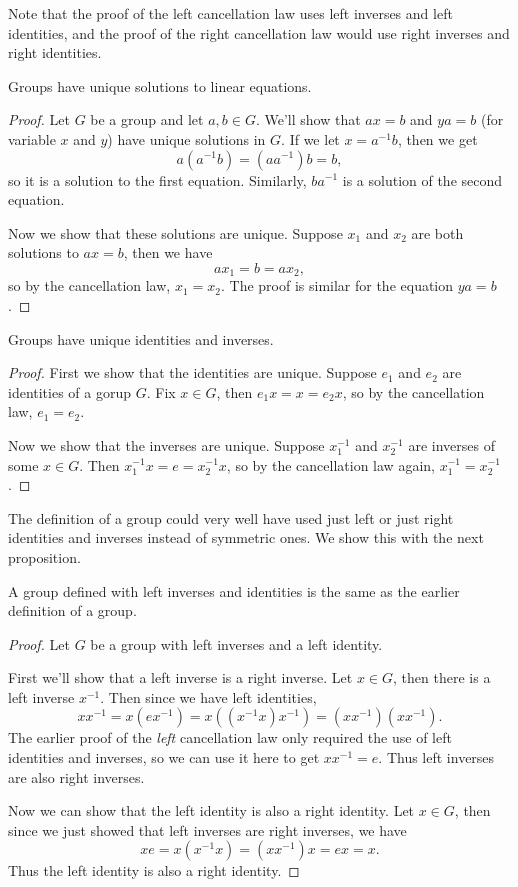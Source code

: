 \documentclass[10pt]{report}
\begin{document}
Note that the proof of the left cancellation law uses left inverses and left identities, and the proof of the right cancellation law would use right inverses and right identities.

\begin{prop}
	Groups have unique solutions to linear equations.
\end{prop}
\begin{proof}
	Let $G$ be a group and let $a,b \in G$. We'll show that $ax=b$ and $ya=b$ (for variable $x$ and $y$) have unique solutions in $G$. If we let $x = a^{-1}b$, then we get
	\[
		a (a^{-1}b) = (a a^{-1})b = b,
	\] so it is a solution to the first equation. Similarly, $b a^{-1}$ is a solution of the second equation.

	Now we show that these solutions are unique. Suppose $x_1$ and $x_2$ are both solutions to $ax=b$, then we have
	\[
	ax_1 = b = ax_2,
	\] so by the cancellation law, $x_1=x_2$. The proof is similar for the equation $ya=b$.
\end{proof}

\begin{prop}
	Groups have unique identities and inverses.
\end{prop}
\begin{proof}
	First we show that the identities are unique. Suppose $e_1$ and $e_2$ are identities of a gorup $G$. Fix $x \in G$, then $e_1 x = x = e_2 x$, so by the cancellation law, $e_1=e_2$.

	Now we show that the inverses are unique. Suppose $x_1^{-1}$ and $x_2^{-1}$ are inverses of some $x \in G$. Then $x_1^{-1}x=e=x_2^{-1}x$, so by the cancellation law again, $x_1^{-1}=x_2^{-1}$.
\end{proof}

\begin{note}{}{}
	The definition of a group could very well have used just left or just right identities and inverses instead of symmetric ones. We show this with the next proposition.
\end{note}

\begin{prop}
	A group defined with left inverses and identities is the same as the earlier definition of a group.
\end{prop}
\begin{proof}
	Let $G$ be a group with left inverses and a left identity.

	First we'll show that a left inverse is a right inverse. Let $x \in G$, then there is a left inverse $x^{-1}$. Then since we have left identities,
	\[
		x x^{-1} = x (e x^{-1}) = x ( (x^{-1} x) x^{-1}) = (x x^{-1}) (x x^{-1}).
	\] 
	The earlier proof of the \textit{left} cancellation law only required the use of left identities and inverses, so we can use it here to get $x x^{-1} = e.$ Thus left inverses are also right inverses.

	Now we can show that the left identity is also a right identity. Let $x \in G$, then since we just showed that left inverses are right inverses, we have
	\[
		x e = x (x^{-1} x) = (x x^{-1}) x = e x = x.
	\] Thus the left identity is also a right identity.
\end{proof}
\end{document}
